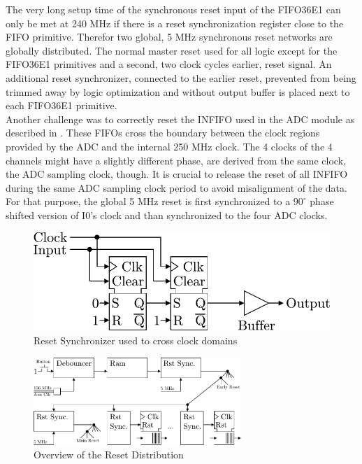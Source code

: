 The very long setup time of the synchronous reset input of the FIFO36E1
can only be met at 240 MHz if there is a reset synchronization register
close to the FIFO primitive.
Therefor two global, 5 MHz synchronous reset networks are globally distributed.
The normal master reset used for all logic except
for the FIFO36E1 primitives and a second, two clock cycles earlier, reset signal.
An additional reset synchronizer, connected to the earlier reset,
prevented from being trimmed away by logic optimization and without 
output buffer is placed next to each FIFO36E1 primitive. \\

Another challenge was to correctly reset the \gls{INFIFO} used in the
\gls{ADC} module as described in . These \glspl{FIFO}
cross the boundary between the clock regions provided by the \gls{ADC} and
the internal 250 MHz clock. The 4 clocks of the 4 channels might
have a slightly different phase, are derived from the same clock, the
\gls{ADC} sampling clock, though. It is crucial to release the reset
of all \gls{INFIFO} during the same \gls{ADC} sampling clock period to avoid
misalignment of the data. For that purpose, the global 5 MHz
reset is first synchronized to a $90^\circ$ phase shifted version of I0's clock
and than synchronized to the four \gls{ADC} clocks. \\

\begin{figure}
  \centering
  \includegraphics{figures/RstSync}
  \caption{Reset Synchronizer used to cross clock domains}
  \label{fig:fpga_rst_sync}
\end{figure}

\begin{figure}
  \centering
  \includegraphics[width=0.7\textwidth]{figures/rst_generation}
  \caption{Overview of the Reset Distribution}
  \label{fig:fpga_rst_generation}
\end{figure}

